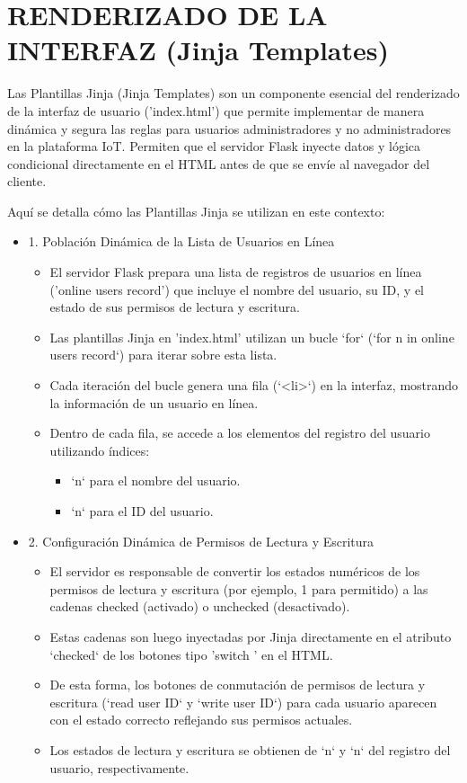 \documentclass{report}
\begin{document}
\section{RENDERIZADO DE LA INTERFAZ (Jinja Templates)}
Las  Plantillas Jinja (Jinja Templates)  son un componente esencial del  renderizado de la interfaz de usuario ('index.html')  que permite implementar 
de manera dinámica y segura las  reglas para usuarios administradores y no administradores  en la plataforma IoT. Permiten que el servidor Flask inyecte 
datos y lógica condicional directamente en el HTML antes de que se envíe al navegador del cliente.

Aquí se detalla cómo las Plantillas Jinja se utilizan en este contexto:
\begin{itemize}
    \item 1. Población Dinámica de la Lista de Usuarios en Línea
    \begin{itemize}
        \item El servidor Flask prepara una lista de registros de usuarios en línea ('online users record') que incluye el nombre del usuario, 
              su ID, y el estado de sus permisos de lectura y escritura.
        \item Las plantillas Jinja en 'index.html' utilizan un bucle `for` (`for n in online users record`) para iterar sobre esta lista.
        \item Cada iteración del bucle genera una fila (`<li>`) en la interfaz, mostrando la información de un usuario en línea.
        \item Dentro de cada fila, se accede a los elementos del registro del usuario utilizando índices:
        \begin{itemize}
            \item `n` para el  nombre del usuario.
            \item `n` para el  ID del usuario.
        \end{itemize}
    \end{itemize}

    \item 2. Configuración Dinámica de Permisos de Lectura y Escritura
    \begin{itemize}
        \item El servidor es responsable de convertir los estados numéricos de los permisos de lectura y escritura (por ejemplo, 1 para permitido) a 
              las cadenas checked (activado) o unchecked (desactivado).
        \item Estas cadenas son luego inyectadas por Jinja directamente en el atributo `checked` de los botones tipo  'switch ' en el HTML.
        \item De esta forma, los botones de conmutación de permisos de lectura y escritura (`read user ID` y `write user ID`) para cada usuario 
              aparecen con el estado correcto reflejando sus permisos actuales.
        \item Los estados de lectura y escritura se obtienen de `n` y `n` del registro del usuario, respectivamente.
    \end{itemize}


\end{itemize}
\end{document}

